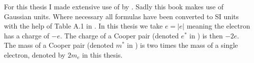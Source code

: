 For this thesis I made extensive use of  by . Sadly this book makes use of Gaussian units. Where necessary all formulas have been converted to SI units with the help of Table A.1 in . In this thesis we take $e = |e|$ meaning the electron has a charge of $-e$. The charge of a Cooper pair (denoted $e^*$ in ) is then $-2e$. The mass of a Cooper pair (denoted $m^*$ in ) is two times the mass of a single electron, denoted by $2m_e$ in this thesis.